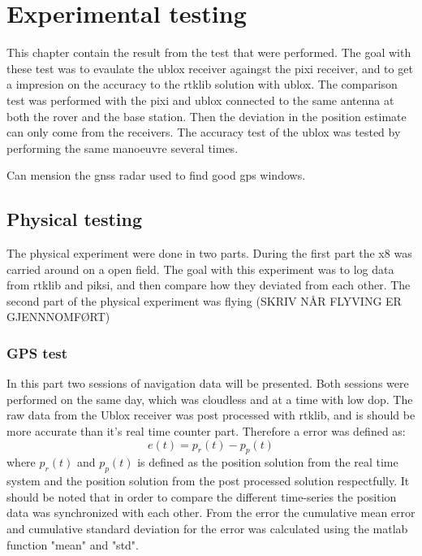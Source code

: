 
\chapter{Experimental testing}
This chapter contain the result from the test that were performed. The goal with these test was to evaulate the ublox receiver againgst the pixi receiver, and to get a impresion on the accuracy to the rtklib solution with ublox. The comparison test was performed with the pixi and ublox connected to the same antenna at both the rover and the base station. Then the deviation in the position estimate can only come from the receivers. The accuracy test of the ublox was tested by performing the same manoeuvre several times.

Can mension the gnss radar used to find good gps windows.
\section{Physical testing}
The physical experiment were done in two parts. During the first part the x8 was carried around on a open field. The goal with this experiment was to log data from rtklib and piksi, and then compare how they deviated from each other. The second part of the physical experiment was flying (SKRIV NÅR FLYVING ER GJENNNOMFØRT)

\subsection{GPS test}
In this part two sessions of navigation data will be presented. Both sessions were performed on the same day, which was cloudless and at a time with low \gls{dop}. The raw data from the Ublox receiver was post processed with rtklib, and is should be more accurate than it's real time counter part. Therefore a error was defined as:
\begin{equation}
e(t) = p_r(t) - p_p(t)
\end{equation}
where $p_r(t)$ and $p_p(t)$ is defined as the position solution from the real time system and the position solution from the post processed solution respectfully. It should be noted that in order to compare the different time-series the position data was synchronized with each other. From the error the cumulative mean error and cumulative standard deviation for the error was calculated using the matlab function "mean" and "std".

